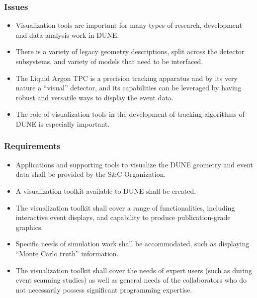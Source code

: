 \subsubsection{Issues}
\begin{itemize}
	
	\item Visualization tools are important for many types of research, development and data analysis work in DUNE.
	
	\item There is a variety of legacy geometry descriptions, split across the detector subsystems, and variety of models that need to be interfaced.
	
	\item The Liquid Argon TPC is a precision tracking apparatus and by its very nature a ``visual'' detector, and 
	its capabilities can be leveraged by having robust and versatile ways to display the event data.
	
	\item The role of visualization tools in the development of tracking algorithms of DUNE is especially important.
\end{itemize}

\subsubsection{Requirements}
\begin{itemize}
	\item Applications and supporting tools to visualize the DUNE geometry and event data shall be provided by the S\&C Organization.
	
	\item A visualization toolkit available to DUNE shall be created.
	
	\item The visualization toolkit shall cover a range of functionalities, including interactive event displays, and capability to produce publication-grade graphics.
	
	\item Specific needs of simulation work shall be accommodated, such as displaying ``Monte Carlo truth'' information.
	
	\item The visualization toolkit shall cover the needs of expert users (such as during event scanning studies) as well as general needs of the collaborators who do not necessarily possess significant programming expertise.
	
\end{itemize}

